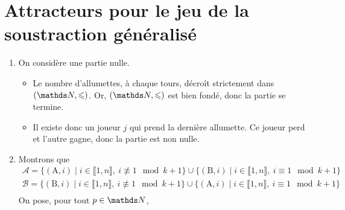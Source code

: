 \section{Attracteurs pour le jeu de la soustraction généralisé}

\begin{enumerate}
	\item On considère une partie nulle.
		\begin{itemize}
			\item Le nombre d'allumettes, à chaque tours, décroît strictement dans $(\N, {\le})$. Or, $(\N, {\le})$ est bien fondé, donc la partie se termine.
			\item Il existe donc un joueur $j$ qui prend la dernière allumette. Ce joueur perd et l'autre gagne, donc la partie est non nulle.
		\end{itemize}
	\item Montrons que
		\begin{gather*}
			\mathcal{A} = \{(\mathrm{A},i)  \mid i \in \llbracket 1,n \rrbracket,\: i\not\equiv 1\mod{k + 1} \} \cup \{(\mathrm{B}, i)  \mid i \in \llbracket 1,n \rrbracket,\: i \equiv 1 \mod {k + 1}\}\\
			\mathcal{B} = \{(\mathrm{B},i)  \mid i \in \llbracket 1,n \rrbracket,\: i\not\equiv 1\mod{k + 1} \} \cup \{(\mathrm{A}, i)  \mid i \in \llbracket 1,n \rrbracket,\: i \equiv 1 \mod {k + 1}\}\\
		\end{gather*}
		On pose, pour tout $p \in \N$, 
\end{enumerate}
